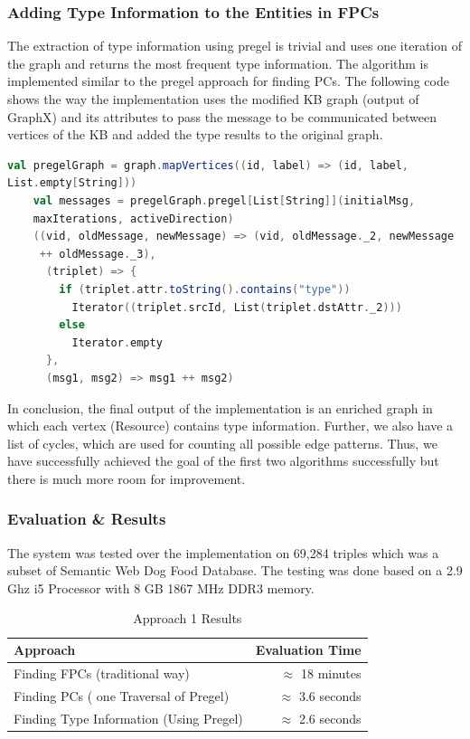 \documentclass{easychair}
\begin{document}
\subsubsection{Adding Type Information to the Entities in FPCs}

The extraction of type information using pregel is trivial and uses one iteration of the graph and returns the most frequent  type information. The algorithm is implemented similar to the pregel approach for finding PCs.
The following code shows  the way the implementation uses the modified KB graph (output of GraphX) and its attributes to pass the message to be communicated between vertices of the KB and added the type results to the original graph.



\begin{lstlisting}[language=Scala]
val pregelGraph = graph.mapVertices((id, label) => (id, label,
List.empty[String]))
    val messages = pregelGraph.pregel[List[String]](initialMsg,
    maxIterations, activeDirection)
    ((vid, oldMessage, newMessage) => (vid, oldMessage._2, newMessage
     ++ oldMessage._3),
      (triplet) => {
        if (triplet.attr.toString().contains("type"))
          Iterator((triplet.srcId, List(triplet.dstAttr._2)))
        else
          Iterator.empty
      },
      (msg1, msg2) => msg1 ++ msg2)

\end{lstlisting}

In conclusion, the final output of the implementation is an enriched graph in  which each vertex (Resource) contains type information. Further, we also have a list of cycles, which are used for counting all possible edge patterns. Thus, we have successfully achieved the goal of the first two algorithms successfully but there is much more room for improvement.


\subsubsection{Evaluation \& Results}
The system was tested over the implementation on 69,284 triples which was a subset of Semantic Web Dog Food Database.  The testing was done based on a 2.9 Ghz i5 Processor with 8 GB 1867 MHz DDR3 memory.

\begin{table}[htp]
	\begin{centering}
		\begin{tabular}{lr}
		\hline
	    Approach            & Evaluation Time \\
		\hline
		Finding FPCs (traditional way)      &  $\approx$ 18 minutes  \\
		 Finding PCs ( one Traversal of Pregel)  &  $\approx$ 3.6 seconds  \\
	      Finding Type Information (Using Pregel)    &  $\approx$ 2.6 seconds  \\
		\hline
		\end{tabular}
		\caption{Approach 1 Results}
		\label{tab:ltbexample}
	\end{centering}
\end{table}
\end{document}
